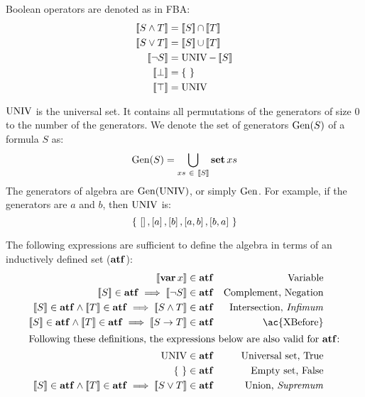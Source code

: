 Boolean operators are denoted as in \ac{FBA}:
\begin{subequations}
\begin{align}
\denote{S \land T} & = \denote{S} \inter \denote{T}\label{eq:denotational-inf}\\
\denote{S \lor T} & = \denote{S} \union \denote{T}\label{eq:denotational-sup}\\
\denote{\lnot S} & = \UNIV - \denote{S} \label{eq:denotational-complement}\\
\denote{\bot} &= \emptyset\label{eq:denotational-bot}\\
\denote{\top} &= \UNIV\label{eq:denotational-top}
\end{align}
\end{subequations}

$\operatorname{UNIV}$ is the universal set. 
It contains all permutations of the generators of size $0$ to the number of the generators.
%
We denote the set of generators $\mathrm{Gen}(S)$ of a formula $S$ as:
\begin{equation}
\mathrm{Gen}(S) = \bigcup_{xs ~\in~ \left[\!\left[S\right]\!\right]} \operatorname{\mathbf{set}} xs\label{eq:generators}
\end{equation}
%
The generators of \ac{algebra} are $\mathrm{Gen}(\operatorname{UNIV})$, or simply $\mathrm{Gen}$.
%
For example, if the generators are $a$ and $b$, then $\operatorname{UNIV}$ is:
%
\[
\left\{~ \left[  \right], \left[ a \right], \left[ b \right], \left[ a,b \right], \left[ b,a \right] ~\right\}
\]


The following expressions are sufficient to define the \ac{algebra} in terms of an inductively defined set ($\mathbf{atf}$):
%
\begin{subequations}
\label{def:algebraset}
\begin{align}
\denote{\var x} & \in \algebraset & \text{Variable}\label{def:algebraset-var}\\
\denote{S} \in \algebraset \implies \denote{\lnot S} & \in \algebraset & \text{Complement, Negation}\label{def:algebraset-compl}\\
\denote{S} \in \algebraset \land \denote{T} \in \algebraset \implies \denote{S \land T} & \in \algebraset & \text{Intersection, \emph{Infimum}}\label{def:algebraset-inf}\\
\denote{S} \in \algebraset \land \denote{T} \in \algebraset \implies \denote{\xbefore{S}{T}} & \in \algebraset & \text{\ac{XBefore}}\label{def:algebraset-xbefore}\\
\intertext{Following these definitions, the expressions below are also valid for $\algebraset$:}
\UNIV &\in \algebraset & \text{Universal set, True}\label{def:algebraset-true}\\
\emptyset &\in \algebraset & \text{Empty set, False}\label{def:algebraset-false}\\
\denote{S} \in \algebraset \land \denote{T} \in \algebraset \implies \denote{S \lor T} &\in \algebraset & \text{Union, \emph{Supremum}}\label{def:algebraset-sup}
\end{align}
\end{subequations}

